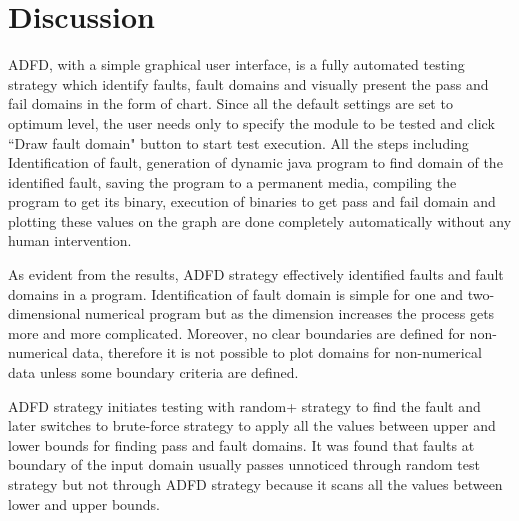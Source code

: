 



\section{Discussion} \label{sec:discussion4}

ADFD, with a simple graphical user interface, is a fully automated testing strategy which identify faults, fault domains and visually present the pass and fail domains in the form of chart. Since all the default settings are set to optimum level, the user needs only to specify the module to be tested and click ``Draw fault domain" button to start test execution. All the steps including Identification of fault, generation of dynamic java program to find domain of the identified fault, saving the program to a permanent media, compiling the program to get its binary, execution of binaries to get pass and fail domain and plotting these values on the graph are done completely automatically without any human intervention.

As evident from the results, ADFD strategy effectively identified faults and fault domains in a program. Identification of fault domain is simple for one and two-dimensional numerical program but as the dimension increases the process gets more and more complicated. Moreover, no clear boundaries are defined for non-numerical data, therefore it is not possible to plot domains for non-numerical data unless some boundary criteria are defined.

ADFD strategy initiates testing with random+ strategy to find the fault and later switches to brute-force strategy to apply all the values between upper and lower bounds for finding pass and fault domains. It was found that faults at boundary of the input domain usually passes unnoticed through random test strategy but not through ADFD strategy because it scans all the values between lower and upper bounds.


